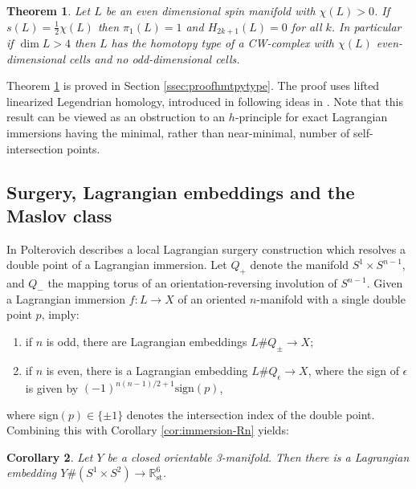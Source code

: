 \documentclass[reqno,11pt]{amsart}
\numberwithin{equation}{section}
\theoremstyle{my}
\theoremstyle{my}
\newtheorem{thm}{Theorem}[section]
\newtheorem{Corollary}[thm]{Corollary}
\theoremstyle{your}
\newcommand{\R}{\mathbb{R}}
\newcommand{\st}{\mathrm{st}}
\begin{document}
\begin{thm}\label{thm:hmtpytype} Let $L$ be an even dimensional spin manifold with $\chi(L)>0$. If $s(L)=\frac{1}{2}\chi(L)$ then $\pi_1(L) = 1$ and $H_{2k+1}(L) = 0$ for all $k$. In particular if $\dim L > 4$ then $L$ has the homotopy type of a CW-complex with $\chi(L)$ even-dimensional cells and no odd-dimensional cells.
\end{thm} 

Theorem \ref{thm:hmtpytype} is proved in Section \ref{ssec:proofhmtpytype}. The proof uses lifted linearized Legendrian homology, introduced in \cite{ES2} following ideas in \cite{Damian}. Note that this result can be viewed as an obstruction to an $h$-principle for exact Lagrangian immersions having the minimal, rather than near-minimal, number of self-intersection points. 

\subsection*{Surgery, Lagrangian embeddings and the Maslov class}
In \cite{Polterovich} Polterovich describes a local  Lagrangian  surgery construction which resolves   a double point of a Lagrangian immersion.
  Let $Q_+$ denote the manifold $S^1 \times S^{n-1}$, and $Q_-$ the mapping torus of an orientation-reversing involution of $S^{n-1}$.  Given  a Lagrangian immersion $f\colon L \rightarrow X$ of an oriented $n$-manifold with a single double point $p$, \cite[Propositions 1 \& 2]{Polterovich} imply:
\begin{enumerate}
\item if $n$ is odd,  there are Lagrangian embeddings $L \# Q_{\pm} \rightarrow X$; 
\item if $n$ is even, there is a Lagrangian embedding $L \# Q_{\epsilon} \rightarrow X$, where the sign of $\epsilon$ is given by $(-1)^{n(n-1)/2 + 1} \textrm{sign}(p)$,
\end{enumerate}
where sign$(p) \in \{\pm 1\}$ denotes the intersection index of the double point.   Combining this with Corollary \ref{cor:immersion-Rn} yields:

\begin{Corollary} \label{Cor:embedded}
Let $Y$ be a closed orientable 3-manifold. Then there is a Lagrangian embedding $Y \# (S^1 \times S^2) \rightarrow \R^6_\st$.
\end{Corollary}
\end{document}
